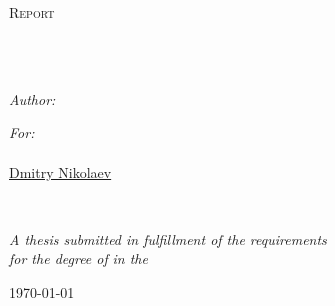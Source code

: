 \documentclass[
12pt, %
english, %
doublespacing
,
nolistspacing, %
toctotoc, %
parskip, %
headsepline, %
]{MastersDoctoralThesis} %
\author{Leshem \textsc{Choshen}} %
\begin{document}
	\frontmatter
	\pagestyle{plain}


\begin{titlepage}
	\begin{center}
		
		\vspace*{.06\textheight}
		{\scshape\LARGE \univname\par}\vspace{1.5cm} %
		\textsc{\Large Report}\\[0.5cm] %
		
		\HRule \\[0.4cm] %
		{\LARGE \bfseries \ttitle\par}\vspace{0.4cm} %
		\HRule \\[1.5cm] %
		
		\begin{minipage}[t]{0.4\textwidth}
			\begin{flushleft} \large
				\emph{Author:}\\
				\authorname %
			\end{flushleft}
		\end{minipage}
		\begin{minipage}[t]{0.4\textwidth}
			\begin{flushright} \large
				\emph{For:} \\
				\href{http://huji.academia.edu/EitanGrossman}{\supname}\\ %
				\href{http://rggu.academia.edu/DmitryNikolaev}{Dmitry Nikolaev} 
			\end{flushright}
		\end{minipage}\\[0.5cm]
		
		\vfill
		
		\large \textit{A thesis submitted in fulfillment of the requirements\\ for the degree of \degreename} %
		\textit{in the}\\[0.4cm]
		
		\vfill
		
		{\large \today}\\[1cm] %
		
		\vfill
	\end{center}
\end{titlepage}
\end{document}
